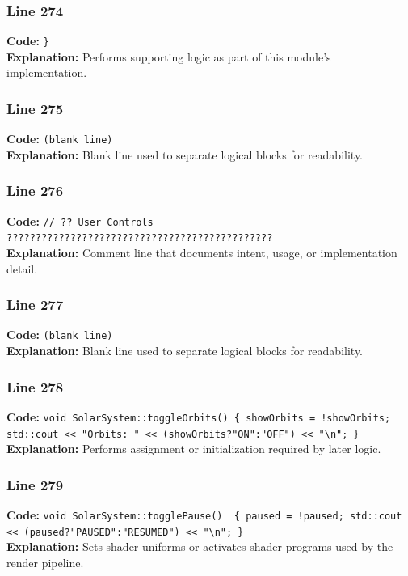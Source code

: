 \documentclass[11pt,a4paper]{article}
\begin{document}
\subsubsection*{Line 274}
\textbf{Code:} \verb|}|\\
\textbf{Explanation:} Performs supporting logic as part of this module's implementation.

\subsubsection*{Line 275}
\textbf{Code:} \texttt{(blank line)}\\
\textbf{Explanation:} Blank line used to separate logical blocks for readability.

\subsubsection*{Line 276}
\textbf{Code:} \verb|// ?? User Controls ??????????????????????????????????????????????|\\
\textbf{Explanation:} Comment line that documents intent, usage, or implementation detail.

\subsubsection*{Line 277}
\textbf{Code:} \texttt{(blank line)}\\
\textbf{Explanation:} Blank line used to separate logical blocks for readability.

\subsubsection*{Line 278}
\textbf{Code:} \verb|void SolarSystem::toggleOrbits() { showOrbits = !showOrbits; std::cout << "Orbits: " << (showOrbits?"ON":"OFF") << "\n"; }|\\
\textbf{Explanation:} Performs assignment or initialization required by later logic.

\subsubsection*{Line 279}
\textbf{Code:} \verb|void SolarSystem::togglePause()  { paused = !paused; std::cout << (paused?"PAUSED":"RESUMED") << "\n"; }|\\
\textbf{Explanation:} Sets shader uniforms or activates shader programs used by the render pipeline.
\end{document}
